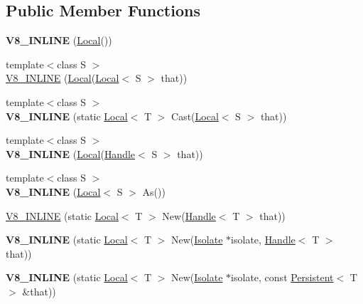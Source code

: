 \subsection*{Public Member Functions}
\begin{DoxyCompactItemize}
\item 
\hypertarget{classv8_1_1_local_acd71c6a66f5114d76b3a3c02a16547c1}{}{\bfseries V8\+\_\+\+I\+N\+L\+I\+N\+E} (\hyperlink{classv8_1_1_local}{Local}())\label{classv8_1_1_local_acd71c6a66f5114d76b3a3c02a16547c1}

\item 
{\footnotesize template$<$class S $>$ }\\\hyperlink{classv8_1_1_local_a5f4598866402a6a896e2bf5863a3ab4c}{V8\+\_\+\+I\+N\+L\+I\+N\+E} (\hyperlink{classv8_1_1_local}{Local}(\hyperlink{classv8_1_1_local}{Local}$<$ S $>$ that))
\item 
\hypertarget{classv8_1_1_local_a3ddee57e5675b4b1404f26427d23dcd0}{}{\footnotesize template$<$class S $>$ }\\{\bfseries V8\+\_\+\+I\+N\+L\+I\+N\+E} (static \hyperlink{classv8_1_1_local}{Local}$<$ T $>$ Cast(\hyperlink{classv8_1_1_local}{Local}$<$ S $>$ that))\label{classv8_1_1_local_a3ddee57e5675b4b1404f26427d23dcd0}

\item 
\hypertarget{classv8_1_1_local_a486ff680a63de804f8d82768e7bb0790}{}{\footnotesize template$<$class S $>$ }\\{\bfseries V8\+\_\+\+I\+N\+L\+I\+N\+E} (\hyperlink{classv8_1_1_local}{Local}(\hyperlink{classv8_1_1_handle}{Handle}$<$ S $>$ that))\label{classv8_1_1_local_a486ff680a63de804f8d82768e7bb0790}

\item 
\hypertarget{classv8_1_1_local_a08ed8f55acad5cd41566be97cae027d9}{}{\footnotesize template$<$class S $>$ }\\{\bfseries V8\+\_\+\+I\+N\+L\+I\+N\+E} (\hyperlink{classv8_1_1_local}{Local}$<$ S $>$ As())\label{classv8_1_1_local_a08ed8f55acad5cd41566be97cae027d9}

\item 
\hyperlink{classv8_1_1_local_a4bcce5962fa2f2b9131a110f79350e7c}{V8\+\_\+\+I\+N\+L\+I\+N\+E} (static \hyperlink{classv8_1_1_local}{Local}$<$ T $>$ New(\hyperlink{classv8_1_1_handle}{Handle}$<$ T $>$ that))
\item 
\hypertarget{classv8_1_1_local_a8b0ac03c4da07a94a9cb91620a0062d9}{}{\bfseries V8\+\_\+\+I\+N\+L\+I\+N\+E} (static \hyperlink{classv8_1_1_local}{Local}$<$ T $>$ New(\hyperlink{classv8_1_1_isolate}{Isolate} $\ast$isolate, \hyperlink{classv8_1_1_handle}{Handle}$<$ T $>$ that))\label{classv8_1_1_local_a8b0ac03c4da07a94a9cb91620a0062d9}

\item 
\hypertarget{classv8_1_1_local_a9c051652a3b358357eac451b3ed10fa1}{}{\bfseries V8\+\_\+\+I\+N\+L\+I\+N\+E} (static \hyperlink{classv8_1_1_local}{Local}$<$ T $>$ New(\hyperlink{classv8_1_1_isolate}{Isolate} $\ast$isolate, const \hyperlink{classv8_1_1_persistent}{Persistent}$<$ T $>$ \&that))\label{classv8_1_1_local_a9c051652a3b358357eac451b3ed10fa1}

\end{DoxyCompactItemize}
